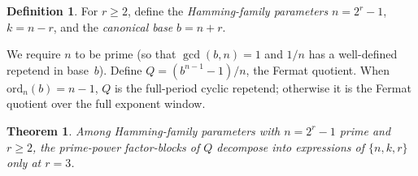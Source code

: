 \documentclass[11pt]{article}
\newtheorem{theorem}{Theorem}
\theoremstyle{definition}
\newtheorem{definition}{Definition}
\theoremstyle{remark}
\begin{document}
\begin{definition}
For $r \geq 2$, define the \emph{Hamming-family parameters}
$n = 2^r-1$, $k = n-r$, and the \emph{canonical base} $b = n+r$.
\end{definition}

We require $n$ to be prime (so that $\gcd(b,n)=1$ and $1/n$ has a
well-defined repetend in base~$b$). Define
$Q = (b^{n-1}-1)/n$, the Fermat quotient. When $\text{ord}_n(b)=n-1$,
$Q$ is the full-period cyclic repetend; otherwise it is the Fermat
quotient over the full exponent window.

\begin{theorem}\label{thm:main}
Among Hamming-family parameters with $n=2^r-1$ prime and $r \geq 2$,
the prime-power factor-blocks of $Q$ decompose into expressions of
$\{n,k,r\}$ only at $r=3$.
\end{theorem}
\end{document}
